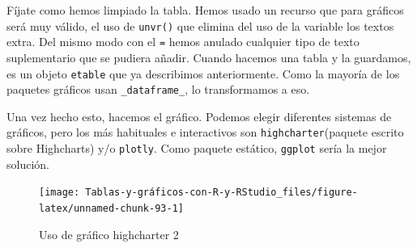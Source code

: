 \documentclass[
]{book}
\newenvironment{Shaded}{\begin{snugshade}}{\end{snugshade}}
\newcommand{\AttributeTok}[1]{\textcolor[rgb]{0.77,0.63,0.00}{#1}}
\newcommand{\ConstantTok}[1]{\textcolor[rgb]{0.00,0.00,0.00}{#1}}
\newcommand{\FunctionTok}[1]{\textcolor[rgb]{0.00,0.00,0.00}{#1}}
\newcommand{\NormalTok}[1]{#1}
\newcommand{\SpecialCharTok}[1]{\textcolor[rgb]{0.00,0.00,0.00}{#1}}
\newcommand{\StringTok}[1]{\textcolor[rgb]{0.31,0.60,0.02}{#1}}
\begin{document}
Fíjate como hemos limpiado la tabla. Hemos usado un recurso que para gráficos será muy válido, el uso de \texttt{unvr()} que elimina del uso de la variable los textos extra. Del mismo modo con el \texttt{\textquotesingle{}\textbar{}\textquotesingle{}=} hemos anulado cualquier tipo de texto suplementario que se pudiera añadir. Cuando hacemos una tabla y la guardamos, es un objeto \texttt{etable} que ya describimos anteriormente. Como la mayoría de los paquetes gráficos usan \texttt{\_dataframe\_}, lo transformamos a eso.

Una vez hecho esto, hacemos el gráfico. Podemos elegir diferentes sistemas de gráficos, pero los más habituales e interactivos son \texttt{highcharter}(paquete escrito sobre Highcharts) y/o \texttt{plotly}. Como paquete estático, \texttt{ggplot} sería la mejor solución.

\begin{Shaded}
\end{Shaded}

\begin{figure}[H]

{\centering \texttt{[image: Tablas-y-gráficos-con-R-y-RStudio\_files/figure-latex/unnamed-chunk-93-1]} 

}

\caption{Uso de gráfico highcharter 2}\label{fig:unnamed-chunk-93}
\end{figure}
\end{document}
